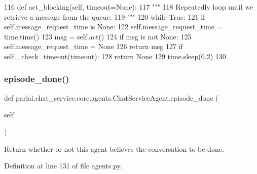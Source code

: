 \begin{DoxyCode}
116     \textcolor{keyword}{def }act\_blocking(self, timeout=None):
117         \textcolor{stringliteral}{"""}
118 \textcolor{stringliteral}{        Repeatedly loop until we retrieve a message from the queue.}
119 \textcolor{stringliteral}{        """}
120         \textcolor{keywordflow}{while} \textcolor{keyword}{True}:
121             \textcolor{keywordflow}{if} self.message\_request\_time \textcolor{keywordflow}{is} \textcolor{keywordtype}{None}:
122                 self.message\_request\_time = time.time()
123             msg = self.act()
124             \textcolor{keywordflow}{if} msg \textcolor{keywordflow}{is} \textcolor{keywordflow}{not} \textcolor{keywordtype}{None}:
125                 self.message\_request\_time = \textcolor{keywordtype}{None}
126                 \textcolor{keywordflow}{return} msg
127             \textcolor{keywordflow}{if} self.\_check\_timeout(timeout):
128                 \textcolor{keywordflow}{return} \textcolor{keywordtype}{None}
129             time.sleep(0.2)
130 
\end{DoxyCode}
\mbox{\label{classparlai_1_1chat__service_1_1core_1_1agents_1_1ChatServiceAgent_afcc6a8b904305b7b34d47ddfa99327ef}} 
\subsubsection{\texorpdfstring{episode\+\_\+done()}{episode\_done()}}
{\footnotesize\ttfamily def parlai.\+chat\+\_\+service.\+core.\+agents.\+Chat\+Service\+Agent.\+episode\+\_\+done (\begin{DoxyParamCaption}\item[{}]{self }\end{DoxyParamCaption})}

\begin{DoxyVerb}Return whether or not this agent believes the conversation to be done.
\end{DoxyVerb}
 

Definition at line 131 of file agents.\+py.



